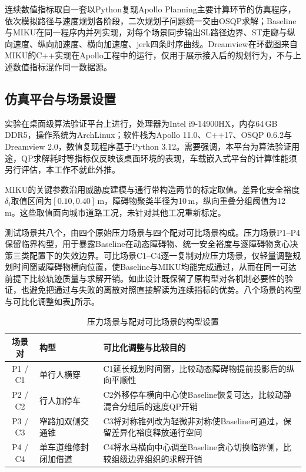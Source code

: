 \documentclass[a4paper,11pt]{ctexart}
\theoremstyle{definition}
\begin{document}
连续数值指标取自一套以Python复现Apollo Planning主要计算环节的仿真程序，依次模拟路径与速度规划各阶段，二次规划子问题统一交由OSQP求解；Baseline与MIKU在同一程序内并列实现，对每个场景同步输出SL路径边界、ST走廊与纵向速度、纵向加速度、横向加速度、jerk四条时序曲线。Dreamview在环截图来自MIKU的C++实现在Apollo工程中的运行，仅用于展示接入后的规划行为，不与上述数值指标混作同一数据源。

\subsection{仿真平台与场景设置}
\label{subsec:exp_setup}

实验在桌面级算法验证平台上进行，处理器为Intel i9-14900HX，内存64\,GB DDR5，操作系统为ArchLinux；软件栈为Apollo 11.0、C++17、OSQP 0.6.2与Dreamview 2.0，数值复现程序基于Python 3.12。需要强调，本平台为算法验证用途，QP求解耗时等指标仅反映该桌面环境的表现，车载嵌入式平台的计算性能须另行评估，本工作不就此外推。

MIKU的关键参数沿用威胁度建模与通行带构造两节的标定取值。差异化安全裕度$\delta_i$取值区间为$[0.10, 0.40]$\,m，障碍物聚类半径为10\,m，纵向重叠分组阈值为12\,m。这些取值面向城市道路工况，未针对其他工况重新标定。

测试场景共八个，由四个原始压力场景与四个配对可比场景构成。压力场景P1--P4保留临界构型，用于暴露Baseline在动态障碍物、统一安全裕度与逐障碍物贪心决策三类配置下的失效边界。可比场景C1--C4逐一复制对应压力场景，仅轻量调整规划时间窗或障碍物横向位置，使Baseline与MIKU均能完成通过，从而在同一可达前提下比较轨迹质量与求解开销。如此设计既保留了原构型对各机制必要性的验证，也避免把通过与失败的离散对照直接解读为连续指标的优势。八个场景的构型与可比化调整如表\ref{tab:exp_scenarios}所示。

\begin{table}[htbp]
\centering
\caption{压力场景与配对可比场景的构型设置}
\label{tab:exp_scenarios}
\small
\begin{tabular}{c l p{7.4cm}}
\toprule
\textbf{场景对} & \textbf{构型} & \textbf{可比化调整与比较目的} \\
\midrule
P1 / C1 & 单行人横穿 & C1延长规划时间窗，比较动态障碍物提前投影后的纵向平顺性 \\
P2 / C2 & 行人加停车 & C2外移停车横向中心使Baseline恢复可达，比较动静混合分组后的速度QP开销 \\
P3 / C3 & 窄路加双侧交通锥 & C3将对称锥列改为轻微非对称使Baseline可通过，保留差异化裕度释放通行空间 \\
P4 / C4 & 单车道维修封闭加借道 & C4将水马横向中心调至Baseline贪心切换临界侧，比较组级边界组织的求解开销 \\
\bottomrule
\end{tabular}
\end{table}
\end{document}
